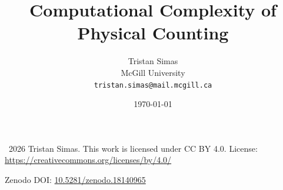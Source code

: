 \documentclass[11pt]{article}
\title{Computational Complexity of Physical Counting}
\author{
  Tristan Simas\\
  McGill University\\
  \texttt{tristan.simas@mail.mcgill.ca}
}
\date{\today}
\begin{document}
\maketitle

\begingroup
\footnotesize
\noindent\textcopyright\ 2026 Tristan Simas.
This work is licensed under CC BY 4.0.
License: \url{https://creativecommons.org/licenses/by/4.0/}
\par
\noindent Zenodo DOI: \href{https://doi.org/10.5281/zenodo.18140965}{10.5281/zenodo.18140965}
\par
\endgroup

\begin{abstract}

\end{abstract}


















\end{document}
